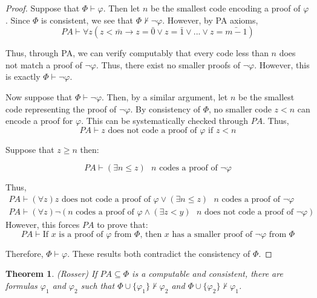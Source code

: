 \documentclass[a4paper,10pt]{article}
\newtheorem{theorem}{Theorem}[section]
\let\phi\varphi
\newcommand*\map{\rightarrow}
\newcommand*\n{\newline\par}
\newcommand*\prf{\vdash}
\newcommand*\np{\neg\phi}
\newcommand*\notprf{\not\vdash}
\begin{document}
  \begin{proof}
   Suppose that $\Phi \prf \phi$. Then let $n$ be the smallest code encoding a proof of $\phi$. Since $\Phi$ is consistent, we see that $\Phi \not\prf \neg\phi$. However, by PA axioms,
   \begin{equation*}
    PA \prf \forall z (z < \bar{m} \map z = \bar{0} \lor z = \bar{1} \lor ... \lor z = \bar{m-1})
   \end{equation*}

   Thus, through PA, we can verify computably that every code less than $n$ does not match a proof of $\neg\phi$. Thus, there exist no smaller proofs of $\neg\phi$. However, this is exactly $\Phi \prf \neg\phi$. \n
   Now suppose that $\Phi \prf \np$. Then, by a similar argument, let $n$ be the smallest code representing the proof of $\np$. By consistency of $\Phi$, no smaller code $z < n$ can encode a proof for $\phi$. This can be systematically checked through $PA$. 
   Thus,
   \begin{equation*}
      PA \prf \text{$z$ does not code a proof of $\phi$ if $z < n$}
   \end{equation*}

   Suppose that $z \geq n$ then:
   
   \begin{equation*}
    PA \prf (\exists n \leq z) \text{ $n$ codes a proof of $\neg \phi$}
   \end{equation*}

   Thus,
   \begin{gather*}
    PA \prf (\forall z)\text{$z$ does not code a proof of $\phi$}  \lor (\exists n \leq z) \text{ $n$ codes a proof of $\neg \phi$} \\
    PA \prf (\forall z) \neg(\text{$n$ codes a proof of $\phi$}  \land (\exists z < y) \text{ $n$ does not code a proof of $\neg \phi$})
   \end{gather*}
   However, this forces $PA$ to prove that:
   \begin{equation*}
    PA \prf \text{If $x$ is a proof of $\phi$ from $\Phi$, then $x$ has a smaller proof of $\np$ from $\Phi$}
   \end{equation*}
   
   Therefore, $\Phi \prf \phi$. These results both contradict the consistency of $\Phi$.
  \end{proof}

  \begin{theorem}
   (Rosser)
   If $PA \subseteq \Phi$ is a computable and consistent, there are formulas $\phi_1$ and $\phi_2$ such that $\Phi \cup \{\phi_1\} \notprf \phi_2$ and $\Phi \cup \{\phi_2\} \notprf \phi_1$.
  \end{theorem}
  
\end{document}
